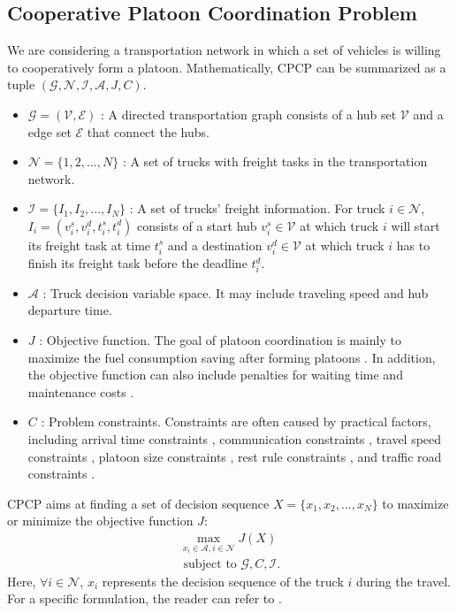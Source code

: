 \documentclass[lettersize,journal]{IEEEtran}
\begin{document}
\subsection{Cooperative Platoon Coordination Problem}
We are considering a transportation network in which a set of vehicles is willing to cooperatively form a platoon. 
Mathematically, CPCP can be summarized as a tuple $(\mathcal{G},\mathcal{N},\mathcal{I},\mathcal{A},J,C)$.
\begin{itemize}
    \item [-] $\mathcal{G} = (\mathcal{V}, \mathcal{E})$ : A directed transportation graph consists of a hub set $\mathcal{V}$ and a edge set $\mathcal{E}$ that connect the hubs.
    \item [-] $\mathcal{N}=\{1,2,...,N\}$ : A set of trucks with freight tasks in the transportation network.
    \item [-] $\mathcal{I} = \{I_1,I_2,...,I_N\}$ : A set of trucks' freight information. For truck $i\in \mathcal{N}$, $I_i=(v_i^s,v_i^d,t_i^s,t_i^d)$ consists of a start hub $v_i^s \in \mathcal{V}$ at which truck $i$ will start its freight task at time $t_i^s$ and a destination $v_i^d \in \mathcal{V}$ at which truck $i$ has to finish its freight task before the deadline $t_i^d$.
    \item [-] $\mathcal{A}$ : Truck decision variable space. It may include traveling speed and hub departure time.
    \item [-] $J$ : Objective function. The goal of platoon coordination is mainly to maximize the fuel consumption saving after forming platoons \cite{davila2013environmental,bishop2017evaluation}. In addition, the objective function can also include penalties for waiting time \cite{johansson2023hub} and maintenance costs \cite{bouchery2022coalition}.
    \item [-] $C$ : Problem constraints. Constraints are often caused by practical factors, including arrival time constraints \cite{bai2022approximate}, communication constraints \cite{wei2023multi}, travel speed constraints \cite{hoef2019predictive}, platoon size constraints \cite{hu2024optimal}, rest rule constraints \cite{xu2022truck}, and traffic road constraints \cite{choi2024optimizing}.
\end{itemize}
CPCP aims at finding a set of decision sequence $X=\{x_1,x_2,...,x_N\}$ to maximize or minimize the objective function $J$:
\begin{equation}
    \begin{array}{ll}
    \max\limits_{x_i \in \mathcal{A},i \in \mathcal{N}}  J(X) \\
    \text { subject to } \mathcal{G},C,\mathcal{I}.
    \end{array}
\end{equation}
Here, $\forall i \in \mathcal{N}$, $x_i$ represents the decision sequence of the truck $i$ during the travel.
For a specific formulation, the reader can refer to \cite{wei2024multi}.
\end{document}
